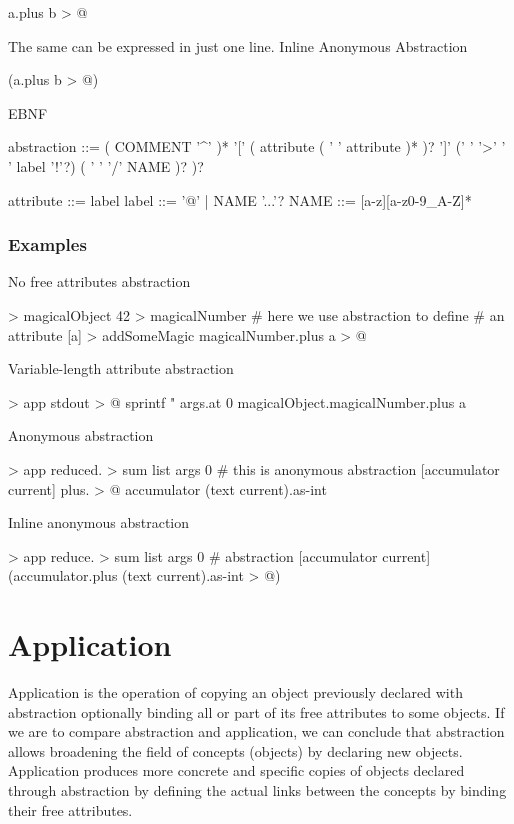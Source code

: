 \documentclass[12pt]{book}
\begin{document}
\begin{ffcode}
[a b]
  a.plus b > @
\end{ffcode}

The same can be expressed in just one line.
Inline Anonymous Abstraction

\begin{ffcode}
[a b] (a.plus b > @)
\end{ffcode}

EBNF

\begin{ffcode}
abstraction ::= ( COMMENT '^' )*
            '[' ( attribute ( ' ' attribute )* )? ']'
            (' ' '>' ' ' label '!'?) ( ' ' '/' NAME )? )?
            
attribute ::= label
label ::= '@' | NAME '...'?
NAME ::= [a-z][a-z0-9_A-Z]*
\end{ffcode}

\subsubsection{Examples}

No free attributes abstraction
\begin{ffcode}
[] > magicalObject
  42 > magicalNumber
  # here we use abstraction to define 
  # an attribute
  [a] > addSomeMagic
    magicalNumber.plus a > @
\end{ffcode}

Variable-length attribute abstraction
\begin{ffcode}
[args...] > app
  stdout > @
    sprintf
      "\n%
      args.at 0
      magicalObject.magicalNumber.plus a
\end{ffcode}

Anonymous abstraction
\begin{ffcode}
[args...] > app
  reduced. > sum
    list args
    0
    # this is anonymous abstraction
    [accumulator current]
      plus. > @
        accumulator
        (text current).as-int
\end{ffcode}

Inline anonymous abstraction
\begin{ffcode}
[args...] > app
  reduce. > sum
    list args
    0
    # abstraction
    [accumulator current] (accumulator.plus (text current).as-int > @)
\end{ffcode}

\section{Application}
Application is the operation of copying an object previously declared with abstraction optionally binding all or part of its free attributes to some objects.
If we are to compare abstraction and application, we can conclude that abstraction allows broadening the field of concepts (objects) by declaring new objects. Application produces more concrete and specific copies of objects declared through abstraction by defining the actual links between the concepts by binding their free attributes.
\end{document}

